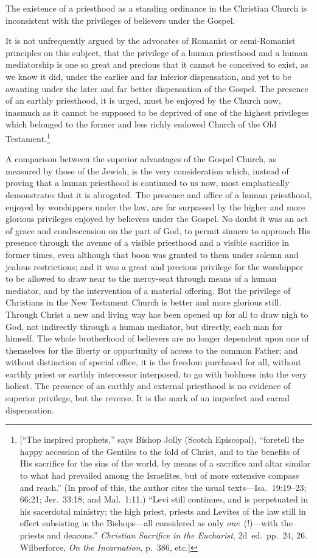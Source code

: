 \documentclass[
]{book}
\begin{document}
The existence of a priesthood as a standing ordinance in the Christian Church is inconsistent with the privileges of believers under the Gospel.

It is not unfrequently argued by the advocates of Romanist or semi-Romanist principles on this subject, that the privilege of a human priesthood and a human mediatorship is one so great and precious that it cannot be conceived to exist, as we know it did, under the earlier and far inferior dispensation, and yet to be awanting under the later and far better dispensation of the Gospel. The presence of an earthly priesthood, it is urged, must be enjoyed by the Church now, inasmuch as it cannot be supposed to be deprived of one of the highest privileges which belonged to the former and less richly endowed Church of the Old Testament.\footnote{{[}``The inspired prophets,'' says Bishop Jolly (Scotch Episcopal), ``foretell the happy accession of the Gentiles to the fold of Christ, and to the benefits of His sacrifice for the sins of the world, by means of a sacrifice and altar similar to what had prevailed among the Israelites, but of more extensive compass and reach.'' (In proof of this, the author cites the usual texts---Isa.~19:19--23; 66:21; Jer.~33:18; and Mal.~1:11.) ``Levi still continues, and is perpetuated in his sacerdotal ministry; the high priest, priests and Levites of the law still in effect subsisting in the Bishops---all considered as only \emph{one}~(!)---with the priests and deacons.'' \emph{Christian Sacrifice in the Eucharist}, 2d~ed.~pp.~24, 26. Wilberforce, \emph{On the Incarnation}, p.~386, etc.{]}}

A comparison between the superior advantages of the Gospel Church, as measured by those of the Jewish, is the very consideration which, instead of proving that a human priesthood is continued to us now, most emphatically demonstrates that it is abrogated. The presence and office of a human priesthood, enjoyed by worshippers under the law, are far surpassed by the higher and more glorious privileges enjoyed by believers under the Gospel. No doubt it was an act of grace and condescension on the part of God, to permit sinners to approach His presence through the avenue of a visible priesthood and a visible sacrifice in former times, even although that boon was granted to them under solemn and jealous restrictions; and it was a great and precious privilege for the worshipper to be allowed to draw near to the mercy-seat through means of a human mediator, and by the intervention of a material offering. But the privilege of Christians in the New Testament Church is better and more glorious still. Through Christ a new and living way has been opened up for all to draw nigh to God, not indirectly through a human mediator, but directly, each man for himself. The whole brotherhood of believers are no longer dependent upon one of themselves for the liberty or opportunity of access to the common Father; and without distinction of special office, it is the freedom purchased for all, without earthly priest or earthly intercessor interposed, to go with boldness into the very holiest. The presence of an earthly and external priesthood is no evidence of superior privilege, but the reverse. It is the mark of an imperfect and carnal dispensation.
\end{document}
